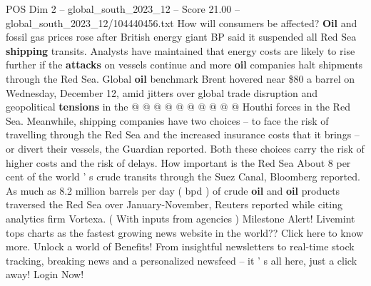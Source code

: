 \begin{textsample}{POS Dim 2 – global\_south\_2023\_12 – Score 21.00 – global\_south\_2023\_12/104440456.txt}
How will consumers be affected? \textbf{Oil} and fossil gas prices rose after British energy giant BP said it suspended all Red Sea \textbf{shipping} transits.
Analysts have maintained that energy costs are likely to rise further if the \textbf{attacks} on vessels continue and more \textbf{oil} companies halt shipments through the Red Sea.
Global \textbf{oil} benchmark Brent hovered near \$80 a barrel on Wednesday, December 12, amid jitters over global trade disruption and geopolitical \textbf{tensions} in the @ @ @ @ @ @ @ @ @ @ Houthi forces in the Red Sea.
Meanwhile, shipping companies have two choices -- to face the risk of travelling through the Red Sea and the increased insurance costs that it brings -- or divert their vessels, the Guardian reported.
Both these choices carry the risk of higher costs and the risk of delays.
How important is the Red Sea About 8 per cent of the world ' s crude transits through the Suez Canal, Bloomberg reported.
As much as 8.2 million barrels per day ( bpd ) of crude \textbf{oil} and \textbf{oil} products traversed the Red Sea over January-November, Reuters reported while citing analytics firm Vortexa. ( With inputs from agencies ) Milestone Alert!
Livemint tops charts as the fastest growing news website in the world??
Click here to know more.
Unlock a world of Benefits!
From insightful newsletters to real-time stock tracking, breaking news and a personalized newsfeed -- it ' s all here, just a click away!
Login Now!

\end{textsample}
